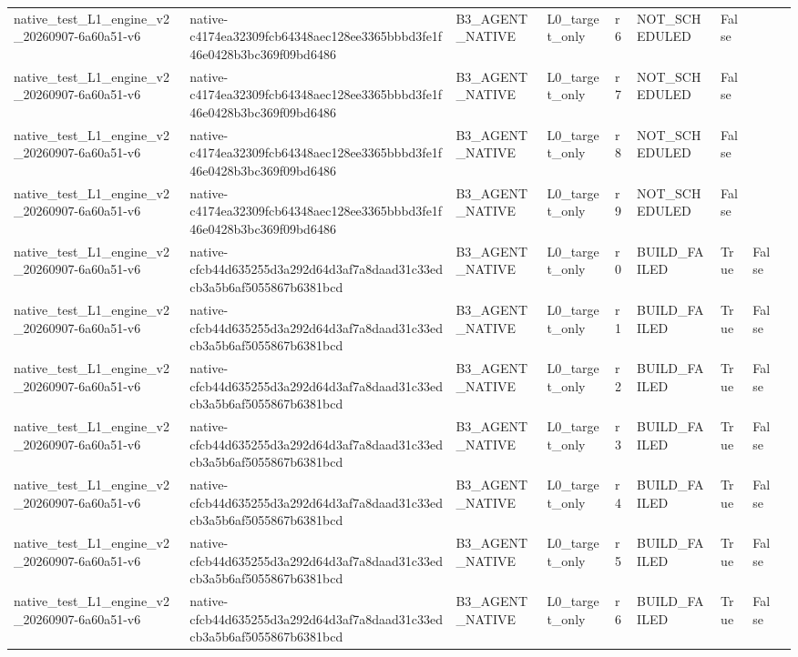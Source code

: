 \begin{tabular}{lllllllll}
native\_test\_L1\_engine\_v2\_20260907-6a60a51-v6 & native-c4174ea32309fcb64348aec128ee3365bbbd3fe1f46e0428b3bc369f09bd6486 & B3\_AGENT\_NATIVE & L0\_target\_only & r6 & NOT\_SCHEDULED & False &  &  \\
native\_test\_L1\_engine\_v2\_20260907-6a60a51-v6 & native-c4174ea32309fcb64348aec128ee3365bbbd3fe1f46e0428b3bc369f09bd6486 & B3\_AGENT\_NATIVE & L0\_target\_only & r7 & NOT\_SCHEDULED & False &  &  \\
native\_test\_L1\_engine\_v2\_20260907-6a60a51-v6 & native-c4174ea32309fcb64348aec128ee3365bbbd3fe1f46e0428b3bc369f09bd6486 & B3\_AGENT\_NATIVE & L0\_target\_only & r8 & NOT\_SCHEDULED & False &  &  \\
native\_test\_L1\_engine\_v2\_20260907-6a60a51-v6 & native-c4174ea32309fcb64348aec128ee3365bbbd3fe1f46e0428b3bc369f09bd6486 & B3\_AGENT\_NATIVE & L0\_target\_only & r9 & NOT\_SCHEDULED & False &  &  \\
native\_test\_L1\_engine\_v2\_20260907-6a60a51-v6 & native-cfcb44d635255d3a292d64d3af7a8daad31c33edcb3a5b6af5055867b6381bcd & B3\_AGENT\_NATIVE & L0\_target\_only & r0 & BUILD\_FAILED & True & False &  \\
native\_test\_L1\_engine\_v2\_20260907-6a60a51-v6 & native-cfcb44d635255d3a292d64d3af7a8daad31c33edcb3a5b6af5055867b6381bcd & B3\_AGENT\_NATIVE & L0\_target\_only & r1 & BUILD\_FAILED & True & False &  \\
native\_test\_L1\_engine\_v2\_20260907-6a60a51-v6 & native-cfcb44d635255d3a292d64d3af7a8daad31c33edcb3a5b6af5055867b6381bcd & B3\_AGENT\_NATIVE & L0\_target\_only & r2 & BUILD\_FAILED & True & False &  \\
native\_test\_L1\_engine\_v2\_20260907-6a60a51-v6 & native-cfcb44d635255d3a292d64d3af7a8daad31c33edcb3a5b6af5055867b6381bcd & B3\_AGENT\_NATIVE & L0\_target\_only & r3 & BUILD\_FAILED & True & False &  \\
native\_test\_L1\_engine\_v2\_20260907-6a60a51-v6 & native-cfcb44d635255d3a292d64d3af7a8daad31c33edcb3a5b6af5055867b6381bcd & B3\_AGENT\_NATIVE & L0\_target\_only & r4 & BUILD\_FAILED & True & False &  \\
native\_test\_L1\_engine\_v2\_20260907-6a60a51-v6 & native-cfcb44d635255d3a292d64d3af7a8daad31c33edcb3a5b6af5055867b6381bcd & B3\_AGENT\_NATIVE & L0\_target\_only & r5 & BUILD\_FAILED & True & False &  \\
native\_test\_L1\_engine\_v2\_20260907-6a60a51-v6 & native-cfcb44d635255d3a292d64d3af7a8daad31c33edcb3a5b6af5055867b6381bcd & B3\_AGENT\_NATIVE & L0\_target\_only & r6 & BUILD\_FAILED & True & False &  \\

\end{tabular}
